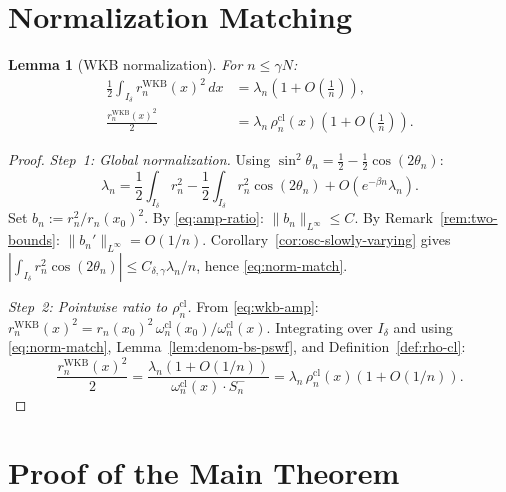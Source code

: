 \documentclass[12pt,a4paper]{amsart}
\newtheorem{lemma}[theorem]{Lemma}
\newcommand{\wncl}{\omega_n^{\mathrm{cl}}}
\newcommand{\rhocl}{\rho^{\mathrm{cl}}}
\begin{document}
\section{Normalization Matching}\label{sec:normalization}

\begin{lemma}[WKB normalization]\label{lem:normalization}
For $n \le \gamma N$:
\begin{align}
  \frac{1}{2}\int_{I_\delta} r_n^{\mathrm{WKB}}(x)^2\,dx
  &= \lambda_n\left(1 + O\!\left(\frac{1}{n}\right)\right),
  \label{eq:norm-match}\\
  \frac{r_n^{\mathrm{WKB}}(x)^2}{2}
  &= \lambda_n\,\rhocl_n(x)
     \left(1 + O\!\left(\frac{1}{n}\right)\right).
  \label{eq:rn-vs-rhocl}
\end{align}
\end{lemma}

\begin{proof}
\textit{Step~1: Global normalization.}
Using $\sin^2\theta_n = \tfrac{1}{2} - \tfrac{1}{2}\cos(2\theta_n)$:
\[
  \lambda_n
  = \frac{1}{2}\int_{I_\delta}r_n^2
    - \frac{1}{2}\int_{I_\delta}r_n^2\cos(2\theta_n)
    + O(e^{-\beta n}\lambda_n).
\]
Set $b_n := r_n^2/r_n(x_0)^2$.
By \eqref{eq:amp-ratio}: $\|b_n\|_{L^\infty} \le C$.
By Remark~\ref{rem:two-bounds}: $\|b_n'\|_{L^\infty} = O(1/n)$.
Corollary~\ref{cor:osc-slowly-varying} gives
$|\int_{I_\delta}r_n^2\cos(2\theta_n)|
\le C_{\delta,\gamma}\lambda_n/n$,
hence \eqref{eq:norm-match}.

\textit{Step~2: Pointwise ratio to $\rhocl_n$.}
From \eqref{eq:wkb-amp}:
$r_n^{\mathrm{WKB}}(x)^2 = r_n(x_0)^2\,\wncl(x_0)/\wncl(x)$.
Integrating over $I_\delta$ and using \eqref{eq:norm-match},
Lemma~\ref{lem:denom-bs-pswf}, and
Definition~\ref{def:rho-cl}:
\[
  \frac{r_n^{\mathrm{WKB}}(x)^2}{2}
  = \frac{\lambda_n(1+O(1/n))}
         {\wncl(x)\cdot S_n^-}
  = \lambda_n\,\rhocl_n(x)(1+O(1/n)).
\]
\end{proof}

\section{Proof of the Main Theorem}\label{sec:weaklimit}
\end{document}
